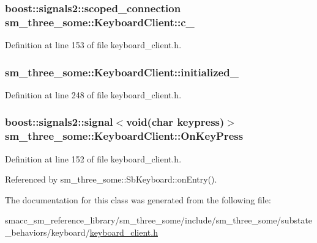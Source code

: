 \subsubsection[{\texorpdfstring{c\+\_\+}{c_}}]{\setlength{\rightskip}{0pt plus 5cm}boost\+::signals2\+::scoped\+\_\+connection sm\+\_\+three\+\_\+some\+::\+Keyboard\+Client\+::c\+\_\+}\hypertarget{classsm__three__some_1_1KeyboardClient_aa4505f5952e5caeb9ee4e1a7d6c85d53}{}\label{classsm__three__some_1_1KeyboardClient_aa4505f5952e5caeb9ee4e1a7d6c85d53}


Definition at line 153 of file keyboard\+\_\+client.\+h.

\subsubsection[{\texorpdfstring{initialized\+\_\+}{initialized_}}]{ sm\+\_\+three\+\_\+some\+::\+Keyboard\+Client\+::initialized\+\_\+\hspace{0.3cm}{\ttfamily [private]}}\hypertarget{classsm__three__some_1_1KeyboardClient_ab374495b4e0587afa6f09da97f4df615}{}\label{classsm__three__some_1_1KeyboardClient_ab374495b4e0587afa6f09da97f4df615}


Definition at line 248 of file keyboard\+\_\+client.\+h.

\subsubsection[{\texorpdfstring{On\+Key\+Press}{OnKeyPress}}]{\setlength{\rightskip}{0pt plus 5cm}boost\+::signals2\+::signal$<$void(char keypress)$>$ sm\+\_\+three\+\_\+some\+::\+Keyboard\+Client\+::\+On\+Key\+Press}\hypertarget{classsm__three__some_1_1KeyboardClient_a96b6b8220c64a1e33480d5ac75c3b8e0}{}\label{classsm__three__some_1_1KeyboardClient_a96b6b8220c64a1e33480d5ac75c3b8e0}


Definition at line 152 of file keyboard\+\_\+client.\+h.



Referenced by sm\+\_\+three\+\_\+some\+::\+Sb\+Keyboard\+::on\+Entry().



The documentation for this class was generated from the following file\+:\begin{DoxyCompactItemize}
\item 
smacc\+\_\+sm\+\_\+reference\+\_\+library/sm\+\_\+three\+\_\+some/include/sm\+\_\+three\+\_\+some/substate\+\_\+behaviors/keyboard/\hyperlink{keyboard__client_8h}{keyboard\+\_\+client.\+h}\end{DoxyCompactItemize}
